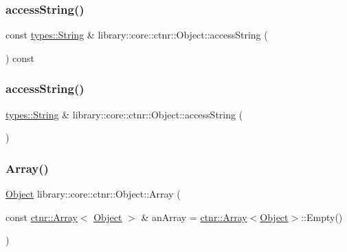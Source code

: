 \mbox{\label{classlibrary_1_1core_1_1ctnr_1_1_object_ab78045e0d09bd479b9dbbd2a07ffef8c}} 
\subsubsection{\texorpdfstring{accessString()}{accessString()}\hspace{0.1cm}{\footnotesize\ttfamily [1/2]}}
{\footnotesize\ttfamily const \mbox{\hyperlink{classlibrary_1_1core_1_1types_1_1_string}{types\+::\+String}} \& library\+::core\+::ctnr\+::\+Object\+::access\+String (\begin{DoxyParamCaption}{ }\end{DoxyParamCaption}) const}

\mbox{\label{classlibrary_1_1core_1_1ctnr_1_1_object_a3797214d18ce733e1867c8bdb70c6cb2}} 
\subsubsection{\texorpdfstring{accessString()}{accessString()}\hspace{0.1cm}{\footnotesize\ttfamily [2/2]}}
{\footnotesize\ttfamily \mbox{\hyperlink{classlibrary_1_1core_1_1types_1_1_string}{types\+::\+String}} \& library\+::core\+::ctnr\+::\+Object\+::access\+String (\begin{DoxyParamCaption}{ }\end{DoxyParamCaption})}

\mbox{\label{classlibrary_1_1core_1_1ctnr_1_1_object_ac8ff8e3bade2b42e869e5007b134523c}} 
\subsubsection{\texorpdfstring{Array()}{Array()}}
{\footnotesize\ttfamily \mbox{\hyperlink{classlibrary_1_1core_1_1ctnr_1_1_object}{Object}} library\+::core\+::ctnr\+::\+Object\+::\+Array (\begin{DoxyParamCaption}\item[{const \mbox{\hyperlink{classlibrary_1_1core_1_1ctnr_1_1_array}{ctnr\+::\+Array}}$<$ \mbox{\hyperlink{classlibrary_1_1core_1_1ctnr_1_1_object}{Object}} $>$ \&}]{an\+Array = {\ttfamily \mbox{\hyperlink{classlibrary_1_1core_1_1ctnr_1_1_array}{ctnr\+::\+Array}}$<$\mbox{\hyperlink{classlibrary_1_1core_1_1ctnr_1_1_object}{Object}}$>$\+:\+:Empty()} }\end{DoxyParamCaption})\hspace{0.3cm}{\ttfamily [static]}}

